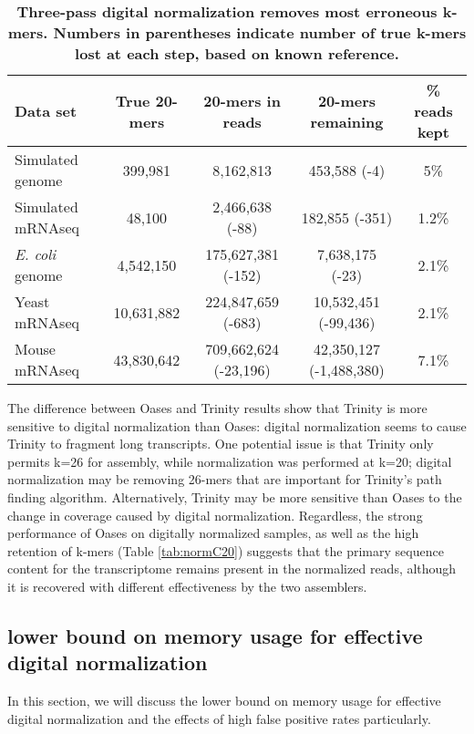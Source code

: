 \begin{table}[!ht]
\centering
\resizebox{16cm}{!} {

\begin{tabular}{|l|c|c|c|c|}
\hline
Data set & True 20-mers & 20-mers in reads & 20-mers remaining & \% reads kept\\
\hline 
Simulated genome & 399,981 & 8,162,813 & 453,588 (-4) & 5\% \\
Simulated mRNAseq & 48,100 & 2,466,638 (-88) & 182,855 (-351) & 1.2\% \\
{\em E. coli} genome & 4,542,150 & 175,627,381 (-152) & 7,638,175 (-23) & 2.1\% \\
Yeast mRNAseq & 10,631,882 & 224,847,659 (-683) & 10,532,451 (-99,436) & 2.1\% \\
Mouse mRNAseq & 43,830,642 & 709,662,624 (-23,196) & 42,350,127 (-1,488,380) & 7.1\% \\
\hline
\end{tabular}
}
\caption{
\bf{Three-pass digital normalization removes most erroneous k-mers.  Numbers
in parentheses indicate number of true k-mers lost at each step, based on known reference.}}

\label{tab:normC5}
\end{table}

% 
The difference between Oases and Trinity results show that Trinity is more
sensitive to digital normalization than Oases: digital normalization seems to
cause Trinity to fragment long transcripts. One potential issue is that
Trinity only permits k=26 for assembly, while normalization was performed at
k=20; digital normalization may be removing 26-mers that are important for
Trinity's path finding algorithm.  Alternatively, Trinity may be more sensitive
than Oases to the change in coverage caused by digital normalization.
Regardless, the strong performance of Oases on digitally normalized samples, as
well as the high retention of k-mers (Table \ref{tab:normC20}) suggests that
the primary sequence content for the transcriptome remains present in the
normalized reads, although it is recovered with different effectiveness by the
two assemblers.


\subsection{lower bound on memory usage for effective digital normalization}

In this section, we will discuss the lower bound on memory usage for effective digital
normalization and the effects of high false positive rates particularly.

